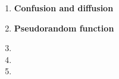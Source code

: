 \documentclass{article}
\begin{document}
	\homeworktitle
	
	\begin{enumerate}[label=\textbf{Task \arabic*:}]
		\item \textbf{Confusion and diffusion}
		\item \textbf{Pseudorandom function}
		\item 
		\item 
		\item 
	\end{enumerate}
	
\end{document}
